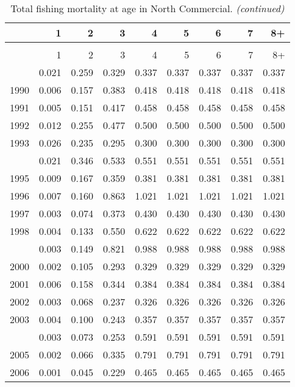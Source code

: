 \documentclass[
]{article}
\begin{document}
\begin{longtable}[t]{lrrrrrrrr}
\caption{\label{tab:North_Commercial-fleet-FAA-table}Total fishing mortality at age in North Commercial.}\\
\toprule
  & 1 & 2 & 3 & 4 & 5 & 6 & 7 & 8+\\
\midrule
\endfirsthead
\caption[]{Total fishing mortality at age in North Commercial. \textit{(continued)}}\\
\toprule
  & 1 & 2 & 3 & 4 & 5 & 6 & 7 & 8+\\
\midrule
\endhead

\endfoot
\bottomrule
\endlastfoot
1989 & 0.021 & 0.259 & 0.329 & 0.337 & 0.337 & 0.337 & 0.337 & 0.337\\
1990 & 0.006 & 0.157 & 0.383 & 0.418 & 0.418 & 0.418 & 0.418 & 0.418\\
1991 & 0.005 & 0.151 & 0.417 & 0.458 & 0.458 & 0.458 & 0.458 & 0.458\\
1992 & 0.012 & 0.255 & 0.477 & 0.500 & 0.500 & 0.500 & 0.500 & 0.500\\
1993 & 0.026 & 0.235 & 0.295 & 0.300 & 0.300 & 0.300 & 0.300 & 0.300\\
\addlinespace
1994 & 0.021 & 0.346 & 0.533 & 0.551 & 0.551 & 0.551 & 0.551 & 0.551\\
1995 & 0.009 & 0.167 & 0.359 & 0.381 & 0.381 & 0.381 & 0.381 & 0.381\\
1996 & 0.007 & 0.160 & 0.863 & 1.021 & 1.021 & 1.021 & 1.021 & 1.021\\
1997 & 0.003 & 0.074 & 0.373 & 0.430 & 0.430 & 0.430 & 0.430 & 0.430\\
1998 & 0.004 & 0.133 & 0.550 & 0.622 & 0.622 & 0.622 & 0.622 & 0.622\\
\addlinespace
1999 & 0.003 & 0.149 & 0.821 & 0.988 & 0.988 & 0.988 & 0.988 & 0.988\\
2000 & 0.002 & 0.105 & 0.293 & 0.329 & 0.329 & 0.329 & 0.329 & 0.329\\
2001 & 0.006 & 0.158 & 0.344 & 0.384 & 0.384 & 0.384 & 0.384 & 0.384\\
2002 & 0.003 & 0.068 & 0.237 & 0.326 & 0.326 & 0.326 & 0.326 & 0.326\\
2003 & 0.004 & 0.100 & 0.243 & 0.357 & 0.357 & 0.357 & 0.357 & 0.357\\
\addlinespace
2004 & 0.003 & 0.073 & 0.253 & 0.591 & 0.591 & 0.591 & 0.591 & 0.591\\
2005 & 0.002 & 0.066 & 0.335 & 0.791 & 0.791 & 0.791 & 0.791 & 0.791\\
2006 & 0.001 & 0.045 & 0.229 & 0.465 & 0.465 & 0.465 & 0.465 & 0.465\\

\end{longtable}
\end{document}
